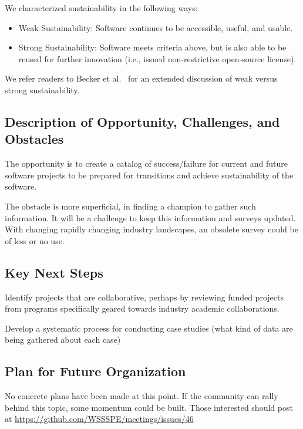 We characterized sustainability in the following ways:
\begin{itemize}

\item Weak Sustainability: Software continues to be accessible, useful, and
usable.

\item Strong Sustainability: Software meets criteria above, but is also able to
be reused for further innovation (i.e., issued non-restrictive open-source
license).

\end{itemize}
We refer readers to Becker et al.~\cite{Becker:2014} for an extended discussion
of weak versus strong sustainability.

\subsection{Description of Opportunity, Challenges, and Obstacles} 

The opportunity is to create a catalog of success/failure for current and future
software projects to be prepared for transitions and achieve sustainability of
the software.

The obstacle is more superficial, in finding a champion to gather such
information. It will be a challenge to keep this information and surveys
updated. With changing rapidly changing industry landscapes, an obsolete survey
could be of less or no use.

\subsection{Key Next Steps}

Identify projects that are collaborative, perhaps by reviewing funded projects
from programs specifically geared towards industry academic collaborations.

Develop a systematic process for conducting case studies (what kind of data are
being gathered about each case)

\subsection{Plan for Future Organization}

No concrete plans have been made at this point. If the community can rally
behind this topic, some momentum could be built. Those interested should post at
\url{https://github.com/WSSSPE/meetings/issues/46}

